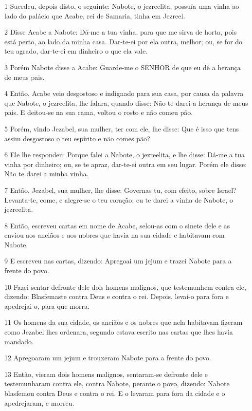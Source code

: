 \par 1 Sucedeu, depois disto, o seguinte: Nabote, o jezreelita, possuía uma vinha ao lado do palácio que Acabe, rei de Samaria, tinha em Jezreel.
\par 2 Disse Acabe a Nabote: Dá-me a tua vinha, para que me sirva de horta, pois está perto, ao lado da minha casa. Dar-te-ei por ela outra, melhor; ou, se for do teu agrado, dar-te-ei em dinheiro o que ela vale.
\par 3 Porém Nabote disse a Acabe: Guarde-me o SENHOR de que eu dê a herança de meus pais.
\par 4 Então, Acabe veio desgostoso e indignado para sua casa, por causa da palavra que Nabote, o jezreelita, lhe falara, quando disse: Não te darei a herança de meus pais. E deitou-se na sua cama, voltou o rosto e não comeu pão.
\par 5 Porém, vindo Jezabel, sua mulher, ter com ele, lhe disse: Que é isso que tens assim desgostoso o teu espírito e não comes pão?
\par 6 Ele lhe respondeu: Porque falei a Nabote, o jezreelita, e lhe disse: Dá-me a tua vinha por dinheiro; ou, se te apraz, dar-te-ei outra em seu lugar. Porém ele disse: Não te darei a minha vinha.
\par 7 Então, Jezabel, sua mulher, lhe disse: Governas tu, com efeito, sobre Israel? Levanta-te, come, e alegre-se o teu coração; eu te darei a vinha de Nabote, o jezreelita.
\par 8 Então, escreveu cartas em nome de Acabe, selou-as com o sinete dele e as enviou aos anciãos e aos nobres que havia na sua cidade e habitavam com Nabote.
\par 9 E escreveu nas cartas, dizendo: Apregoai um jejum e trazei Nabote para a frente do povo.
\par 10 Fazei sentar defronte dele dois homens malignos, que testemunhem contra ele, dizendo: Blasfemaste contra Deus e contra o rei. Depois, levai-o para fora e apedrejai-o, para que morra.
\par 11 Os homens da sua cidade, os anciãos e os nobres que nela habitavam fizeram como Jezabel lhes ordenara, segundo estava escrito nas cartas que lhes havia mandado.
\par 12 Apregoaram um jejum e trouxeram Nabote para a frente do povo.
\par 13 Então, vieram dois homens malignos, sentaram-se defronte dele e testemunharam contra ele, contra Nabote, perante o povo, dizendo: Nabote blasfemou contra Deus e contra o rei. E o levaram para fora da cidade e o apedrejaram, e morreu.
